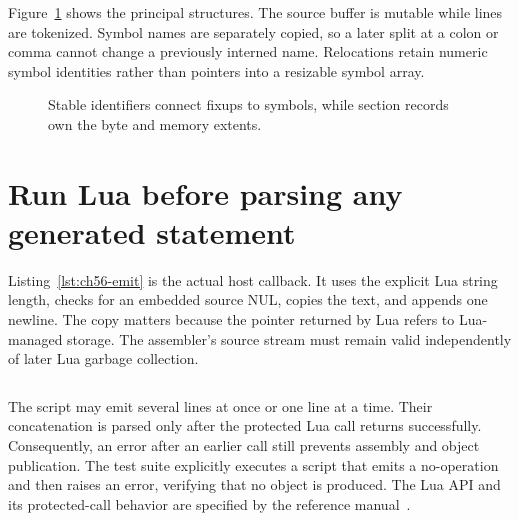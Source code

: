 Figure~\ref{fig:ch56-storage} shows the principal structures.
The source buffer is mutable while lines are tokenized.
Symbol names are separately copied, so a later split at a colon or comma cannot change a previously interned name.
Relocations retain numeric symbol identities rather than pointers into a resizable symbol array.

\begin{figure}[htbp]
\centering
{}
\caption{Stable identifiers connect fixups to symbols, while section records own the byte and memory extents.}
\label{fig:ch56-storage}
\end{figure}

\section{Run Lua before parsing any generated statement}
\label{sec:ch56-emit}

Listing~\ref{lst:ch56-emit} is the actual host callback.
It uses the explicit Lua string length, checks for an embedded source NUL, copies the text, and appends one newline.
The copy matters because the pointer returned by Lua refers to Lua-managed storage.
The assembler's source stream must remain valid independently of later Lua garbage collection.

\begin{listing}[htbp]
\inputminted[firstline=14,lastline=20]{c}{example-code/lua-toolchain/luaas.c}
\caption{The emit callback copies Lua bytes into the assembler-owned source stream.}
\label{lst:ch56-emit}
\end{listing}

The script may emit several lines at once or one line at a time.
Their concatenation is parsed only after the protected Lua call returns successfully.
Consequently, an error after an earlier  call still prevents assembly and object publication.
The test suite explicitly executes a script that emits a no-operation and then raises an error, verifying that no object is produced.
The Lua API and its protected-call behavior are specified by the reference manual~\cite{ierusalimschy-2026-lua}.

